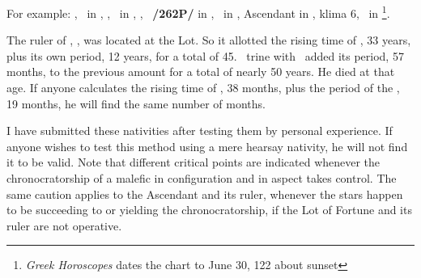 For example: \Sun, \Mercury\, in \Cancer, \Moon, \Mars\, in \Libra, \Saturn, \Venus\, \textbf{/262P/} in \Leo, \Jupiter\, in \Sagittarius, Ascendant in \Capricorn, klima 6, \Fortune\, in \Sagittarius\footnote{\textit{Greek Horoscopes} dates the chart to June 30, 122 about sunset}. 

The ruler of \Sagittarius, \Jupiter, was located at the Lot. So it allotted the rising time of \Sagittarius, 33 years, plus its own period, 12 years, for a total of 45. \Saturn\, trine with \Jupiter\, added its period, 57 months, to the previous amount for a total of nearly 50 years. He died at that age. If anyone calculates the rising time of \Leo, 38 months, plus the period of the \Sun, 19 months, he will find the same number of months.

I have submitted these nativities after testing them by personal experience. If anyone wishes to test this method using a mere hearsay nativity, he will not find it to be valid. Note that different critical points
are indicated whenever the chronocratorship of a malefic in configuration and in aspect takes control. The same caution applies to the Ascendant and its ruler, whenever the stars happen to be succeeding to or yielding the chronocratorship, if the Lot of Fortune and its ruler are not operative.

\newpage